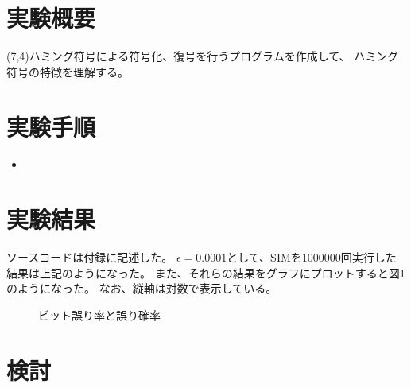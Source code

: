 \documentclass[12pt]{jarticle}
\begin{document}



\section{実験概要}
 (7,4)ハミング符号による符号化、復号を行うプログラムを作成して、
ハミング符号の特徴を理解する。

\section{実験手順}
\begin{itemize}
    \item
\end{itemize}

\section{実験結果}

ソースコードは付録に記述した。
$\epsilon=0.0001$として、SIMを1000000回実行した結果は上記のようになった。
また、それらの結果をグラフにプロットすると図1のようになった。
なお、縦軸は対数で表示している。

\begin{figure}[h]
    \begin{center}
    \end{center}
    \caption{ビット誤り率と誤り確率}
\end{figure}

\section{検討}
\end{document}
